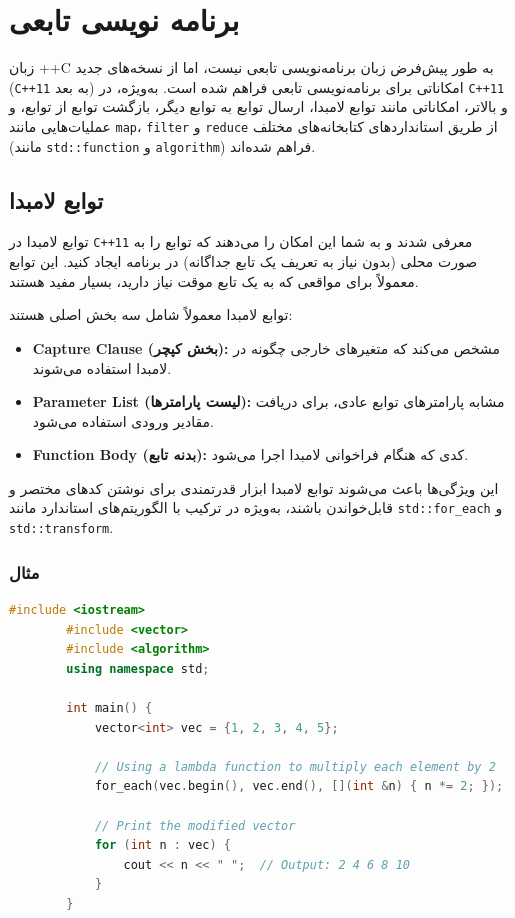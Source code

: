 \documentclass[12pt, a4paper]{report}
\begin{document}
\chapter{برنامه نویسی تابعی}

زبان ++C به طور پیش‌فرض زبان برنامه‌نویسی تابعی نیست، اما از نسخه‌های جدید (\texttt{C++11} به بعد) امکاناتی برای برنامه‌نویسی تابعی فراهم شده است. به‌ویژه، در \texttt{C++11} و بالاتر، امکاناتی مانند توابع لامبدا، ارسال توابع به توابع دیگر، بازگشت توابع از توابع، و عملیات‌هایی مانند \texttt{map}، \texttt{filter} و \texttt{reduce} از طریق استانداردهای کتابخانه‌های مختلف (مانند \texttt{std::function} و \texttt{algorithm}) فراهم شده‌اند.


\section{توابع لامبدا}

توابع لامبدا در \texttt{C++11} معرفی شدند و به شما این امکان را می‌دهند که توابع را به صورت محلی (بدون نیاز به تعریف یک تابع جداگانه) در برنامه ایجاد کنید. این توابع معمولاً برای مواقعی که به یک تابع موقت نیاز دارید، بسیار مفید هستند.

توابع لامبدا معمولاً شامل سه بخش اصلی هستند:
\begin{itemize}
	\item \textbf{Capture Clause (بخش کپچر):} مشخص می‌کند که متغیرهای خارجی چگونه در لامبدا استفاده می‌شوند.
	\item \textbf{Parameter List (لیست پارامترها):} مشابه پارامترهای توابع عادی، برای دریافت مقادیر ورودی استفاده می‌شود.
	\item \textbf{Function Body (بدنه تابع):} کدی که هنگام فراخوانی لامبدا اجرا می‌شود.
\end{itemize}

این ویژگی‌ها باعث می‌شوند توابع لامبدا ابزار قدرتمندی برای نوشتن کدهای مختصر و قابل‌خواندن باشند، به‌ویژه در ترکیب با الگوریتم‌های استاندارد مانند \texttt{std::for\_each} و \texttt{std::transform}.

\subsection{مثال}


\begin{LTR} %
	\begin{lstlisting}[language=C++, breaklines=true]
		#include <iostream>
		#include <vector>
		#include <algorithm>
		using namespace std;
		
		int main() {
			vector<int> vec = {1, 2, 3, 4, 5};
			
			// Using a lambda function to multiply each element by 2
			for_each(vec.begin(), vec.end(), [](int &n) { n *= 2; });
			
			// Print the modified vector
			for (int n : vec) {
				cout << n << " ";  // Output: 2 4 6 8 10
			}
		}
	\end{lstlisting}
\end{LTR}
\end{document}
